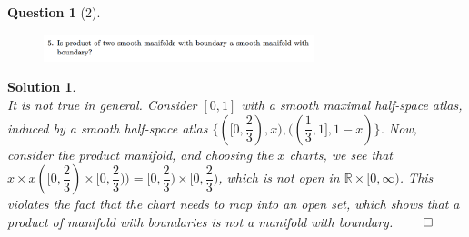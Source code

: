 \documentclass{article} %
\theoremstyle{quest}
\newtheorem*{question}{Question}
\newtheorem*{solution}{Solution}
\begin{document}
\newpage

\begin{question}[2]
\hfill
\begin{figure}[h!]
  \centering
    \includegraphics[width=0.7\textwidth]{geo-2-2.png}
\end{figure}
\end{question}
\begin{solution} \hfill \\
It is not true in general. Consider $[0,1]$ with a smooth maximal half-space atlas,
induced by a smooth half-space atlas 
$\{ ([0,\dfrac{2}{3}),x) , ((\dfrac{1}{3},1],1-x)\}$. Now, consider the product
manifold, and choosing the $x$ charts, we see that 
$x \times x ([0,\dfrac{2}{3}) \times [0,\dfrac{2}{3})) = 
[0,\dfrac{2}{3}) \times [0,\dfrac{2}{3})$, which is not open in
$\mathbb{R} \times [0,\infty)$. This violates the fact that the
chart needs to map into an open set, which shows that a product of manifold
with boundaries is not a manifold with boundary. \hfill $\qed$
\end{solution}

\newpage
\end{document}
